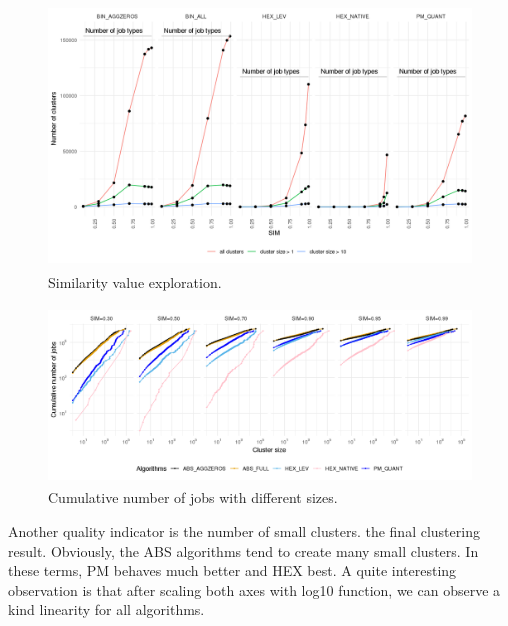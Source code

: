 \documentclass[]{llncs}
\begin{document}
\begin{figure}
  \centering
  \includegraphics[width=4.61in,height=2.76in]{./media/image19.png}
  \caption{Similarity value exploration.}
  \label{fig:sim_eploration}
\end{figure}

\begin{figure}
  \centering
  \includegraphics[width=4.61in,height=1.85in]{./media/image22.png}
  \caption{Cumulative number of jobs with different sizes.}
  \label{fig:cum_num_job_sizes}
\end{figure}
Another quality indicator is the number of small clusters.
 the final clustering result.
Obviously, the ABS algorithms tend to create many small clusters.
In these terms, PM behaves much better and HEX best.
A quite interesting observation is that after scaling both axes with log10 function, we can observe a kind linearity for all algorithms.
\end{document}
